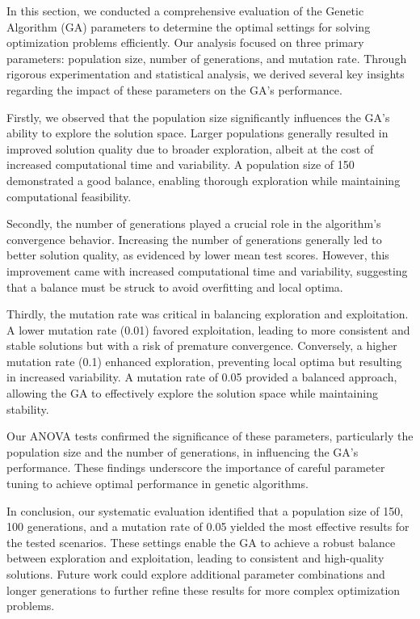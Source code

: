 \documentclass{article}
\begin{document}
    In this section, we conducted a comprehensive evaluation of the Genetic Algorithm (GA) parameters to determine the optimal settings for solving optimization problems efficiently. Our analysis focused on three primary parameters: population size, number of generations, and mutation rate. Through rigorous experimentation and statistical analysis, we derived several key insights regarding the impact of these parameters on the GA's performance.

    Firstly, we observed that the population size significantly influences the GA's ability to explore the solution space. Larger populations generally resulted in improved solution quality due to broader exploration, albeit at the cost of increased computational time and variability. A population size of 150 demonstrated a good balance, enabling thorough exploration while maintaining computational feasibility.

    Secondly, the number of generations played a crucial role in the algorithm's convergence behavior. Increasing the number of generations generally led to better solution quality, as evidenced by lower mean test scores. However, this improvement came with increased computational time and variability, suggesting that a balance must be struck to avoid overfitting and local optima.

    Thirdly, the mutation rate was critical in balancing exploration and exploitation. A lower mutation rate (0.01) favored exploitation, leading to more consistent and stable solutions but with a risk of premature convergence. Conversely, a higher mutation rate (0.1) enhanced exploration, preventing local optima but resulting in increased variability. A mutation rate of 0.05 provided a balanced approach, allowing the GA to effectively explore the solution space while maintaining stability.

    Our ANOVA tests confirmed the significance of these parameters, particularly the population size and the number of generations, in influencing the GA's performance. These findings underscore the importance of careful parameter tuning to achieve optimal performance in genetic algorithms.

    In conclusion, our systematic evaluation identified that a population size of 150, 100 generations, and a mutation rate of 0.05 yielded the most effective results for the tested scenarios. These settings enable the GA to achieve a robust balance between exploration and exploitation, leading to consistent and high-quality solutions. Future work could explore additional parameter combinations and longer generations to further refine these results for more complex optimization problems.
\end{document}
